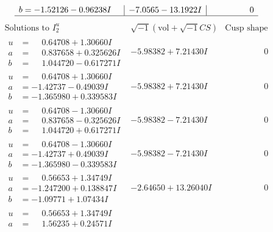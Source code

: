 \documentclass[1p]{elsarticle_modified}
\theoremstyle{definition}
\newcommand{\I}{\sqrt{-1}}
\begin{document}
$$\begin{array}{c|c|c}
\begin{aligned}
b &= -1.52126 - 0.96238 I\end{aligned}
 & -7.0565 - 13.1922 I & \phantom{-0.000000 } 0\\
 \hline 
 \end{array}$$\newpage$$\begin{array}{c|c|c}  
\text{Solutions to }I^u_{2}& \I (\text{vol} + \sqrt{-1}CS) & \text{Cusp shape}\\
 \hline 
\begin{aligned}
u &= \phantom{-}0.64708 + 1.30660 I \\
a &= \phantom{-}0.837658 + 0.325626 I \\
b &= \phantom{-}1.044720 - 0.617271 I\end{aligned}
 & -5.98382 + 7.21430 I & \phantom{-0.000000 } 0 \\ \hline\begin{aligned}
u &= \phantom{-}0.64708 + 1.30660 I \\
a &= -1.42737 - 0.49039 I \\
b &= -1.365980 + 0.339583 I\end{aligned}
 & -5.98382 + 7.21430 I & \phantom{-0.000000 } 0 \\ \hline\begin{aligned}
u &= \phantom{-}0.64708 - 1.30660 I \\
a &= \phantom{-}0.837658 - 0.325626 I \\
b &= \phantom{-}1.044720 + 0.617271 I\end{aligned}
 & -5.98382 - 7.21430 I & \phantom{-0.000000 } 0 \\ \hline\begin{aligned}
u &= \phantom{-}0.64708 - 1.30660 I \\
a &= -1.42737 + 0.49039 I \\
b &= -1.365980 - 0.339583 I\end{aligned}
 & -5.98382 - 7.21430 I & \phantom{-0.000000 } 0 \\ \hline\begin{aligned}
u &= \phantom{-}0.56653 + 1.34749 I \\
a &= -1.247200 + 0.138847 I \\
b &= -1.09771 + 1.07434 I\end{aligned}
 & -2.64650 + 13.26040 I & \phantom{-0.000000 } 0 \\ \hline\begin{aligned}
u &= \phantom{-}0.56653 + 1.34749 I \\
a &= \phantom{-}1.56235 + 0.24571 I \\

\end{aligned}
\end{array}$$
\end{document}
